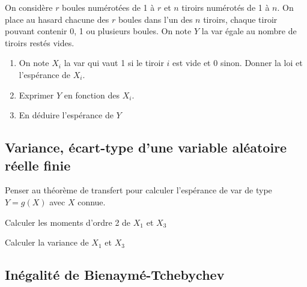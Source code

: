 \documentclass[a4paper, 11pt]{article}
\begin{document}
\begin{exercice} On consid\`ere $r$ boules num\'erot\'ees de 1 \`a $r$ et $n$ tiroirs num\'erot\'es de 1 \`a $n$. On place au hasard chacune des $r$ boules dans l'un des $n$ tiroirs, chaque tiroir pouvant contenir 0, 1 ou plusieurs boules. On note $Y$ la var \'egale au nombre de tiroirs rest\'es vides. 
\begin{enumerate}
\item On note $X_i$ la var qui vaut 1 si le tiroir $i$ est vide et $0$ sinon. Donner la loi  et l'espérance de $X_i$.
\item Exprimer $Y$ en fonction des $X_i$.
\item En déduire l'espérance de $Y$
\end{enumerate}
\end{exercice}

\vspace{7cm}

\subsection{Variance, \'ecart-type d'une variable al\'eatoire r\'eelle finie}


Penser au th\'eor\`{e}me de transfert pour calculer l'esp\'erance de var de type $Y=g(X)$ avec $X$ connue.

\begin{exemple}
Calculer les moments d'ordre 2 de $X_1$ et $X_3$
\end{exemple}





\vspace{3cm}


\begin{exemple}
Calculer la variance de $X_1$ et $X_3$
\end{exemple}


\vspace{3cm}




%
\subsection{In\'egalit\'e de Bienaym\'e-Tchebychev}
\end{document}
